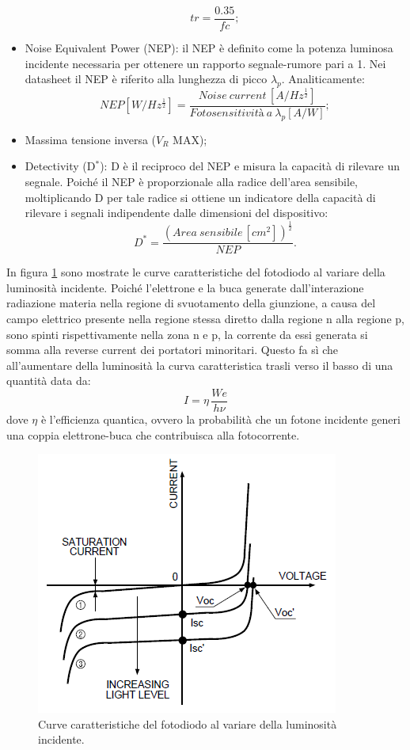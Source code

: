 \documentclass[journal, a4paper]{IEEEtran}
\begin{document}
\begin{itemize}
\begin{equation}
tr = \frac{0.35}{fc};
\end{equation}
\item Noise Equivalent Power (NEP): il NEP è definito come la potenza luminosa incidente necessaria per ottenere un rapporto segnale-rumore pari a 1. Nei datasheet il NEP è riferito alla lunghezza di picco $\lambda _p$. Analiticamente:
\begin{equation}
NEP[W/Hz^{\frac{1}{2}}]=\frac{Noise ~ current \,[A/Hz^{\frac{1}{2}}]}{Fotosensitivit\textit{à} ~ a ~\lambda _p [A/W]};
\end{equation}
\item Massima tensione inversa ($V_R$ MAX);
\item Detectivity (D$^*$): D è il reciproco del NEP e misura la capacità di rilevare un segnale. Poiché il NEP è proporzionale alla radice dell'area sensibile, moltiplicando D per tale radice si ottiene un indicatore della capacità di rilevare i segnali indipendente dalle dimensioni del dispositivo:
\begin{equation}
D^* = \frac{(Area ~ sensibile \,[cm^2])^{\frac{1}{2}}}{NEP}.
\end{equation}
\end{itemize}
In figura \ref{fig:curcar} sono mostrate le curve caratteristiche del fotodiodo al variare della luminosità incidente. Poiché l'elettrone e la buca generate dall'interazione radiazione materia nella regione di svuotamento della giunzione, a causa del campo elettrico presente nella regione stessa diretto dalla regione n alla regione p, sono spinti rispettivamente nella zona n e p, la corrente da essi generata si somma alla reverse current dei portatori minoritari. Questo fa sì che all'aumentare della luminosità la curva caratteristica trasli verso il basso di una quantità data da:
\begin{equation}
I = \eta \, \frac{We}{h\nu}
\end{equation}
dove $\eta$ è l'efficienza quantica, ovvero la probabilità che un fotone incidente generi una coppia elettrone-buca che contribuisca alla fotocorrente.
\begin{figure}[htp]
\centering
\includegraphics[scale=.6]{curve_car_phdiode}
\caption{Curve caratteristiche del fotodiodo al variare della luminosità incidente.}
\label{fig:curcar}
\end{figure}
\end{document}
